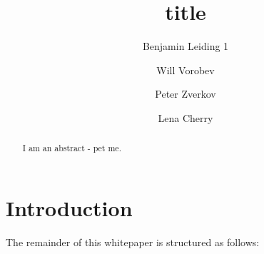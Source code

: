 \documentclass{llncs}
\begin{document}
	{
	\title{title}
	
	\author{Benjamin Leiding 1 \and Will Vorobev \and Peter Zverkov \and Lena Cherry}
	
	
	
	\maketitle


	\begin{abstract}
		
		I am an abstract - pet me.

		
	\end{abstract}
	
	

	
	\section{Introduction}
		\label{s:introduction}
	

		The remainder of this whitepaper is structured as follows: 


}
\end{document}
